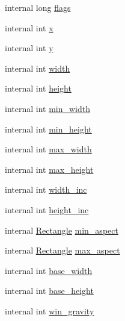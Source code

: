 \begin{DoxyCompactItemize}
\item 
internal long \hyperlink{struct_tao_1_1_platform_1_1_x11_1_1_size_hints_a95a35d4586744d9a62431ec5e273e61f}{flags}
\item 
internal int \hyperlink{struct_tao_1_1_platform_1_1_x11_1_1_size_hints_a006af62b6a540e67981bb8e65e8df64f}{x}
\item 
internal int \hyperlink{struct_tao_1_1_platform_1_1_x11_1_1_size_hints_a5ec3486aadb122b912bfa718e0bd03a6}{y}
\item 
internal int \hyperlink{struct_tao_1_1_platform_1_1_x11_1_1_size_hints_acac23d804da04aaf77aa55fac0622d9d}{width}
\item 
internal int \hyperlink{struct_tao_1_1_platform_1_1_x11_1_1_size_hints_a2a7336e5bae01b3fb5280b55fdf615f5}{height}
\item 
internal int \hyperlink{struct_tao_1_1_platform_1_1_x11_1_1_size_hints_a18ffbb4e1f5c6465ad4b6b5a7f001dbb}{min\_\-width}
\item 
internal int \hyperlink{struct_tao_1_1_platform_1_1_x11_1_1_size_hints_a05f96ecec91d3d6a9e0ba43bd6c63476}{min\_\-height}
\item 
internal int \hyperlink{struct_tao_1_1_platform_1_1_x11_1_1_size_hints_a018ba95923eef44c7025deeab828edf6}{max\_\-width}
\item 
internal int \hyperlink{struct_tao_1_1_platform_1_1_x11_1_1_size_hints_a928a3ffbc07de90b59559917ccbd7617}{max\_\-height}
\item 
internal int \hyperlink{struct_tao_1_1_platform_1_1_x11_1_1_size_hints_acdd816526907d1c20a7bc1d7030e83c9}{width\_\-inc}
\item 
internal int \hyperlink{struct_tao_1_1_platform_1_1_x11_1_1_size_hints_a4d74d4f59c5bd5e696c8abcf95cd416b}{height\_\-inc}
\item 
internal \hyperlink{struct_tao_1_1_platform_1_1_x11_1_1_size_hints_1_1_rectangle}{Rectangle} \hyperlink{struct_tao_1_1_platform_1_1_x11_1_1_size_hints_afbe532c6d054441f0dae9c09c16054f7}{min\_\-aspect}
\item 
internal \hyperlink{struct_tao_1_1_platform_1_1_x11_1_1_size_hints_1_1_rectangle}{Rectangle} \hyperlink{struct_tao_1_1_platform_1_1_x11_1_1_size_hints_a4ab195eed545f688bda7cb9b965956a3}{max\_\-aspect}
\item 
internal int \hyperlink{struct_tao_1_1_platform_1_1_x11_1_1_size_hints_a670237843d16b49404642f9fd61c6788}{base\_\-width}
\item 
internal int \hyperlink{struct_tao_1_1_platform_1_1_x11_1_1_size_hints_af2159998ac63d1ed32b746320885198b}{base\_\-height}
\item 
internal int \hyperlink{struct_tao_1_1_platform_1_1_x11_1_1_size_hints_a19ab42735ca7667538a9cc16a20527f0}{win\_\-gravity}
\end{DoxyCompactItemize}


